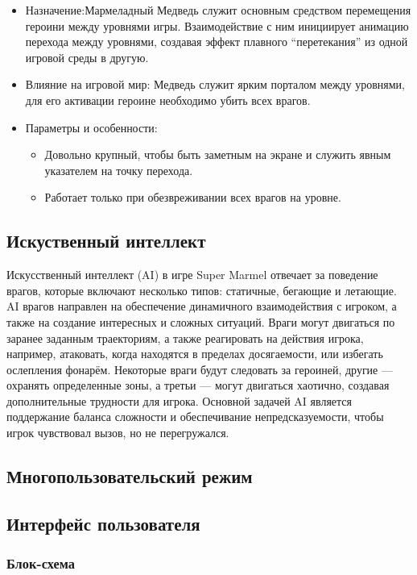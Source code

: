 \documentclass[article,12pt, fleqn]{article}
\begin{document}
\begin{itemize}
\begin{itemize}
        \item Назначение:Мармеладный Медведь служит основным средством перемещения героини между уровнями игры. Взаимодействие с ним инициирует анимацию перехода между уровнями, создавая эффект плавного “перетекания” из одной игровой среды в другую.
        \item Влияние на игровой мир: Медведь служит ярким порталом между уровнями, для его активации героине необходимо убить всех врагов.
        \item Параметры и особенности: 
        \begin{itemize}
            \item Довольно крупный, чтобы быть заметным на экране и служить явным указателем на точку перехода.
            \item Работает только при обезвреживании всех врагов на уровне.
        \end{itemize}
    \end{itemize}

\subsection{Искуственный интеллект}
Искусственный интеллект (AI) в игре Super Marmel отвечает за поведение врагов, которые включают несколько типов: статичные, бегающие и летающие. AI врагов направлен на обеспечение динамичного взаимодействия с игроком, а также на создание интересных и сложных ситуаций. Враги могут двигаться по заранее заданным траекториям, а также реагировать на действия игрока, например, атаковать, когда находятся в пределах досягаемости, или избегать ослепления фонарём. Некоторые враги будут следовать за героиней, другие — охранять определенные зоны, а третьи — могут двигаться хаотично, создавая дополнительные трудности для игрока. Основной задачей AI является поддержание баланса сложности и обеспечивание непредсказуемости, чтобы игрок чувствовал вызов, но не перегружался.

\subsection{Многопользовательский режим}
\subsection{Интерфейс пользователя}
\subsubsection{Блок-схема}

\end{itemize}
\end{document}
